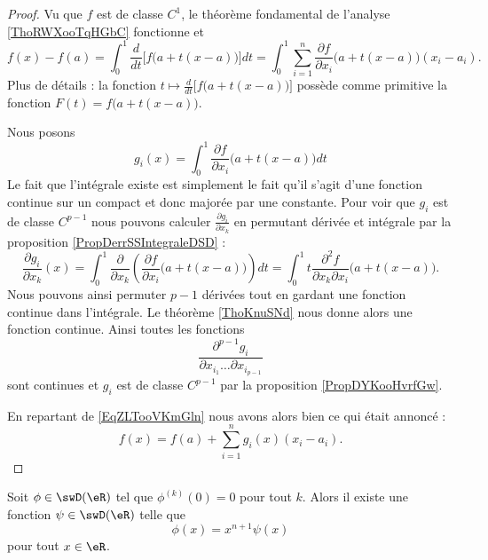 \begin{proof}
    Vu que \( f\) est de classe \( C^1\), le théorème fondamental de l'analyse \ref{ThoRWXooTqHGbC} fonctionne et
    \begin{equation}    \label{EqZLTooVKmGln}
        f(x)-f(a)=\int_0^1\frac{ d }{ dt }\Big[ f\big( a+t(x-a) \big) \Big]dt=\int_0^1\sum_{i=1}^n\frac{ \partial f }{ \partial x_i }\big( a+t(x-a) \big)(x_i-a_i).
    \end{equation}
    Plus de détails : la fonction \( t\mapsto \frac{ d }{ dt }\Big[ f\big( a+t(x-a) \big) \Big]\) possède comme primitive la fonction \( F(t)=f\big( a+t(x-a) \big)\).

    Nous posons 
    \begin{equation}
        g_i(x)=\int_0^1\frac{ \partial f }{ \partial x_i }\big( a+t(x-a) \big)dt
    \end{equation}
    Le fait que l'intégrale existe est simplement le fait qu'il s'agit d'une fonction continue sur un compact et donc majorée par une constante. Pour voir que \( g_i\) est de classe \( C^{p-1}\) nous pouvons calculer \( \frac{ \partial g_i }{ \partial x_k }\) en permutant dérivée et intégrale par la proposition \ref{PropDerrSSIntegraleDSD} :
    \begin{equation}
        \frac{ \partial g_i }{ \partial x_k }(x)=\int_0^1\frac{ \partial  }{ \partial x_k }\left( \frac{ \partial f }{ \partial x_i }\big( a+t(x-a) \big) \right)dt=\int_0^1 t\frac{ \partial^2f }{ \partial x_k\partial x_i }\big( a+t(x-a) \big).
    \end{equation}
    Nous pouvons ainsi permuter \( p-1\) dérivées tout en gardant une fonction continue dans l'intégrale. Le théorème \ref{ThoKnuSNd} nous donne alors une fonction continue. Ainsi toutes les fonctions
    \begin{equation}
        \frac{ \partial^{p-1}g_i }{ \partial x_{i_1}\ldots\partial x_{i_{p-1}} }
    \end{equation}
    sont continues et \( g_i\) est de classe \( C^{p-1}\) par la proposition \ref{PropDYKooHvrfGw}.

    En repartant de \eqref{EqZLTooVKmGln} nous avons alors bien ce qui était annoncé :
    \begin{equation}
        f(x)=f(a)+\sum_{i=1}^ng_i(x)(x_i-a_i).
    \end{equation}
\end{proof}

\begin{corollary}
    Soit \( \phi\in\swD(\eR)\) tel que \( \phi^{(k)}(0)=0\) pour tout \( k\). Alors il existe une fonction \( \psi\in\swD(\eR)\) telle que 
    \begin{equation}
        \phi(x)=x^{n+1}\psi(x)
    \end{equation}
    pour tout \( x\in \eR\).
\end{corollary}

